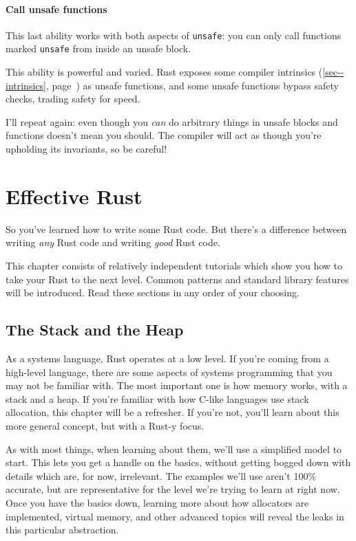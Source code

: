 \documentclass[a4paper,]{book}
\renewcommand*{\hypertarget}[3][\ar]{%
  \def\ar{#2}%
  \label{#1}%
  #3}
\renewcommand*{\hyperlink}[2]{%
 #2 (\autoref{#1}, page~\pageref{#1})}
\begin{document}
\subsubsection{Call unsafe functions}\label{call-unsafe-functions}

This last ability works with both aspects of \texttt{unsafe}: you can
only call functions marked \texttt{unsafe} from inside an unsafe block.

This ability is powerful and varied. Rust exposes some
\protect\hyperlink{sec--intrinsics}{compiler intrinsics} as unsafe
functions, and some unsafe functions bypass safety checks, trading
safety for speed.

I'll repeat again: even though you \emph{can} do arbitrary things in
unsafe blocks and functions doesn't mean you should. The compiler will
act as though you're upholding its invariants, so be careful!

\hypertarget{sec--effective-rust}{\chapter{Effective
Rust}\label{sec--effective-rust}}

So you've learned how to write some Rust code. But there's a difference
between writing \emph{any} Rust code and writing \emph{good} Rust code.

This chapter consists of relatively independent tutorials which show you
how to take your Rust to the next level. Common patterns and standard
library features will be introduced. Read these sections in any order of
your choosing.

\hypertarget{sec--the-stack-and-the-heap}{\section{The Stack and the
Heap}\label{sec--the-stack-and-the-heap}}

As a systems language, Rust operates at a low level. If you're coming
from a high-level language, there are some aspects of systems
programming that you may not be familiar with. The most important one is
how memory works, with a stack and a heap. If you're familiar with how
C-like languages use stack allocation, this chapter will be a refresher.
If you're not, you'll learn about this more general concept, but with a
Rust-y focus.

As with most things, when learning about them, we'll use a simplified
model to start. This lets you get a handle on the basics, without
getting bogged down with details which are, for now, irrelevant. The
examples we'll use aren't 100\% accurate, but are representative for the
level we're trying to learn at right now. Once you have the basics down,
learning more about how allocators are implemented, virtual memory, and
other advanced topics will reveal the leaks in this particular
abstraction.
\end{document}
